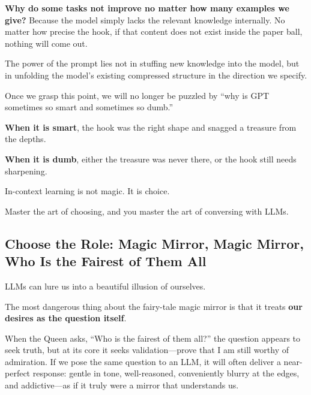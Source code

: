 \vspace{1em}

\textbf{Why do some tasks not improve no matter how many examples we give?} Because the model simply lacks the relevant knowledge internally. No matter how precise the hook, if that content does not exist inside the paper ball, nothing will come out.

\vspace{1em}

The power of the prompt lies not in stuffing new knowledge into the model, but in unfolding the model's existing compressed structure in the direction we specify.



Once we grasp this point, we will no longer be puzzled by ``why is GPT sometimes so smart and sometimes so dumb.''

\textbf{When it is smart}, the hook was the right shape and snagged a treasure from the depths.

\textbf{When it is dumb}, either the treasure was never there, or the hook still needs sharpening.



\begin{importantbox}
In-context learning is not magic. It is choice.

Master the art of choosing, and you master the art of conversing with LLMs.
\end{importantbox}

\newpage
\subsection{Choose the Role: Magic Mirror, Magic Mirror, Who Is the Fairest of Them All}

LLMs can lure us into a beautiful illusion of ourselves.

The most dangerous thing about the fairy-tale magic mirror is that it treats \textbf{our desires as the question itself}.

When the Queen asks, ``Who is the fairest of them all?'' the question appears to seek truth, but at its core it seeks validation---prove that I am still worthy of admiration. If we pose the same question to an LLM, it will often deliver a near-perfect response: gentle in tone, well-reasoned, conveniently blurry at the edges, and addictive---as if it truly were a mirror that understands us.

\vspace{1em}

